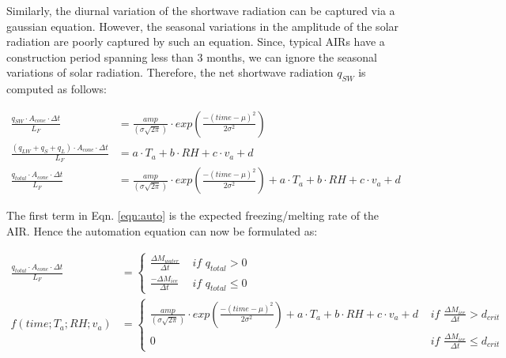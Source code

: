 \documentclass[utf8]{frontiersSCNS}
\begin{document}
Similarly, the diurnal variation of the shortwave radiation can be captured via a gaussian equation. However,
the seasonal variations in the amplitude of the solar radiation are poorly captured by such an equation. Since,
typical AIRs have a construction period spanning less than 3 months, we can ignore the seasonal variations of
solar radiation. Therefore, the net shortwave radiation $q_{SW}$ is computed as follows: 


\begin{subequations}

	\begin{align}
		\label{eqn:SW}
    \frac{q_{SW} \cdot A_{cone} \cdot \Delta t}{L_F} & = \frac{amp}{(\sigma \sqrt{2\pi})} \cdot
    exp\left(\frac{-(time-\mu)^2}{2\sigma^2}\right) \\
		\label{eqn:T}
    \frac{(q_{LW} + q_{S} + q_{L}) \cdot A_{cone} \cdot \Delta t}{L_F} & = a \cdot T_a + b \cdot RH + c \cdot v_a +
  d \\
		\label{eqn:auto}
    \frac{q_{total} \cdot A_{cone} \cdot \Delta t}{L_F} & = \frac{amp}{(\sigma \sqrt{2\pi})} \cdot
    exp\left(\frac{-(time-\mu)^2}{2\sigma^2}\right) + a \cdot T_a + b \cdot RH + c \cdot v_a + d
	\end{align}
\end{subequations}

The first term in Eqn. \ref{eqn:auto} is the expected freezing/melting rate of the AIR. Hence the automation
equation can now be formulated as:

\begin{subequations}
	\begin{align}
		\label{eqn:SW}
  \frac{q_{total} \cdot A_{cone} \cdot \Delta t}{L_F} & = \left\{ \begin{array}{ll}
		\frac{\Delta M_{water}}{\Delta t} & \textit{ if } q_{total} > 0 \\
		\frac{-\Delta M_{ice}}{\Delta t} & \textit{ if } q_{total} \leq 0
	\end{array} \right. \\
  f(time;T_a;RH;v_a) & = \left\{ \begin{array}{ll}
		\frac{amp}{(\sigma \sqrt{2\pi})} \cdot
    exp\left(\frac{-(time-\mu)^2}{2\sigma^2}\right) + a \cdot T_a + b \cdot RH + c \cdot v_a + d
    & \textit{ if } \frac{\Delta M_{ice}}{\Delta t} > d_{crit} \\
		0 & \textit{ if } \frac{\Delta M_{ice}}{\Delta t} \leq d_{crit}
	\end{array} \right.
	\end{align}
\end{subequations}
\end{document}
